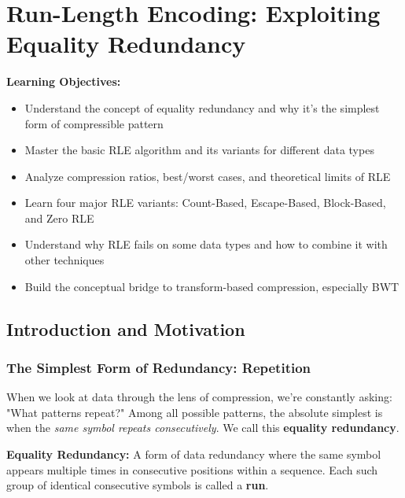 
\section{Run-Length Encoding: Exploiting Equality Redundancy}

\begin{importantbox}
\textbf{Learning Objectives:}
\begin{itemize}
    \item Understand the concept of equality redundancy and why it's the simplest form of compressible pattern
    \item Master the basic RLE algorithm and its variants for different data types
    \item Analyze compression ratios, best/worst cases, and theoretical limits of RLE
    \item Learn four major RLE variants: Count-Based, Escape-Based, Block-Based, and Zero RLE
    \item Understand why RLE fails on some data types and how to combine it with other techniques
    \item Build the conceptual bridge to transform-based compression, especially BWT
\end{itemize}
\end{importantbox}

\subsection{Introduction and Motivation}

\subsubsection{The Simplest Form of Redundancy: Repetition}

When we look at data through the lens of compression, we're constantly asking: "What patterns repeat?" Among all possible patterns, the absolute simplest is when the \textit{same symbol repeats consecutively}. We call this \textbf{equality redundancy}.

\begin{definitionbox}
\textbf{Equality Redundancy:} A form of data redundancy where the same symbol appears multiple times in consecutive positions within a sequence. Each such group of identical consecutive symbols is called a \textbf{run}.
\end{definitionbox}

